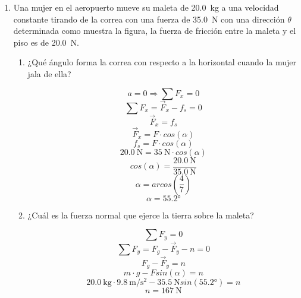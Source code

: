 \documentclass[Física - Práctica.root.tex]{subfiles}
\newcommand{\gravity}[1][per-mode=fraction]{\SI[#1]{9,8}{\meter\per\second\squared}}
\begin{document}
\begin{enumerate}
  \item
        \begin{multicols}{2}
          Una mujer en el aeropuerto mueve su maleta de \SI{20,0}{\kilogram} a una
          velocidad constante tirando de la correa con una fuerza de \SI{35,0}{\newton} con
          una dirección $\theta$ determinada como muestra la figura, la fuerza de
          fricción entre la maleta y el piso es de \SI{20,0}{\newton}.
          \begin{center}
          \end{center}
        \end{multicols}
        \begin{enumerate}
          \item ¿Qué ángulo forma la correa con respecto a la horizontal cuando la mujer jala de ella?
                \begin{center}
                  \[ a = 0 \Rightarrow \sum F_x = 0 \]
                  \[ \sum F_x = \vec{F}_x - f_s = 0 \]
                  \[ \vec{F}_x = f_s \]
                  \[ \vec{F}_x = F\cdot cos(\alpha) \]
                  \[ f_s = F\cdot cos(\alpha) \]
                  \[ \SI{20,0}{\newton} = \SI{35}{\newton}\cdot cos(\alpha)\]
                  \[ cos(\alpha) = \frac{\SI{20,0}{\newton}}{\SI{35,0}{\newton}} \]
                  \[ \alpha = arcos(\frac{4}{7}) \]
                  \[ \boxed{\alpha = \ang{55,2}} \]
                \end{center}
          \item ¿Cuál es la fuerza normal que ejerce la tierra sobre la maleta?
                \begin{center}
                  \[ \sum F_y = 0 \]
                  \[ \sum F_y = F_g - \vec{F}_y - n = 0 \]
                  \[ F_g - \vec{F}_y = n \]
                  \[ m\cdot g - Fsin(\alpha) = n \]
                  \[ \SI{20,0}{\kilogram}\cdot \gravity - \SI{35,5}{\newton}sin(\ang{55,2}) = n \]
                  \[ \boxed{n = \SI{167}{\newton}} \]
                \end{center}
        \end{enumerate}

\end{enumerate}
\end{document}
